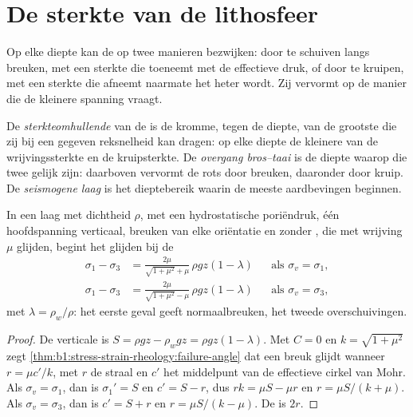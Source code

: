 \section{De sterkte van de lithosfeer}\label{sec:b1:stress-strain-rheology:envelope}

Op elke diepte kan de  op twee manieren bezwijken: door te schuiven langs breuken, met een sterkte die toeneemt met de effectieve druk, of door te kruipen, met een sterkte die afneemt naarmate het heter wordt. Zij vervormt op de manier die de kleinere spanning vraagt.

\begin{definition}\label{def:b1:stress-strain-rheology:strength-envelope}
De \emph{sterkteomhullende} van de  is de kromme, tegen de diepte, van de grootste  die zij bij een gegeven reksnelheid kan dragen: op elke diepte de kleinere van de wrijvingssterkte en de kruipsterkte. De \emph{overgang bros--taai} is de diepte waarop die twee gelijk zijn: daarboven vervormt de rots door breuken, daaronder door kruip. De \emph{seismogene laag} is het dieptebereik waarin de meeste aardbevingen beginnen.
\end{definition}

\begin{proposition}\label{prop:b1:stress-strain-rheology:brittle-gradient}
In een laag met dichtheid $\rho$, met een hydrostatische poriëndruk, één hoofdspanning verticaal, breuken van elke oriëntatie en zonder , die met wrijving $\mu$ glijden, begint het glijden bij de 
\begin{align*}
  \sigma_1 - \sigma_3 &= \frac{2\mu}{\sqrt{1+\mu^2} + \mu}\,\rho g z(1-\lambda)
  && \text{als $\sigma_v = \sigma_1$}, \\
  \sigma_1 - \sigma_3 &= \frac{2\mu}{\sqrt{1+\mu^2} - \mu}\,\rho g z(1-\lambda)
  && \text{als $\sigma_v = \sigma_3$},
\end{align*}
met $\lambda = \rho_w/\rho$: het eerste geval geeft normaalbreuken, het tweede overschuivingen.
\end{proposition}

\begin{proof}
De verticale  is $S = \rho g z - \rho_w g z = \rho g z(1-\lambda)$.
Met $C = 0$ en $k = \sqrt{1+\mu^2}$ zegt \cref{thm:b1:stress-strain-rheology:failure-angle} dat een breuk glijdt wanneer $r = \mu c'/k$, met $r$ de straal en $c'$ het middelpunt van de effectieve cirkel van Mohr. Als $\sigma_v = \sigma_1$, dan is $\sigma_1' = S$ en $c' = S - r$, dus $rk = \mu S - \mu r$ en $r = \mu S/(k+\mu)$. Als $\sigma_v = \sigma_3$, dan is $c' = S + r$ en $r = \mu S/(k-\mu)$. De  is $2r$.
\end{proof}

